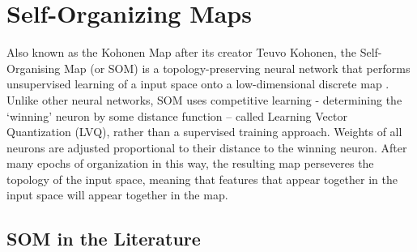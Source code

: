 \documentclass{article}
\begin{document}




\section{Self-Organizing Maps}
Also known as the Kohonen Map after its creator Teuvo Kohonen, the Self-Organising Map (or SOM) is a topology-preserving neural network that performs unsupervised learning of a input space onto a low-dimensional discrete map \cite{kohonen1990self}. 
Unlike other neural networks, SOM uses competitive learning - determining the `winning' neuron by some distance function -- called Learning Vector Quantization (LVQ), rather than a supervised training approach. 
Weights of all neurons are adjusted proportional to their distance to the winning neuron. After many epochs of organization in this way, the resulting map perseveres the topology of the input space, meaning that features that appear together in the input space will appear together in the map.


\subsection{SOM in the Literature}
\end{document}
